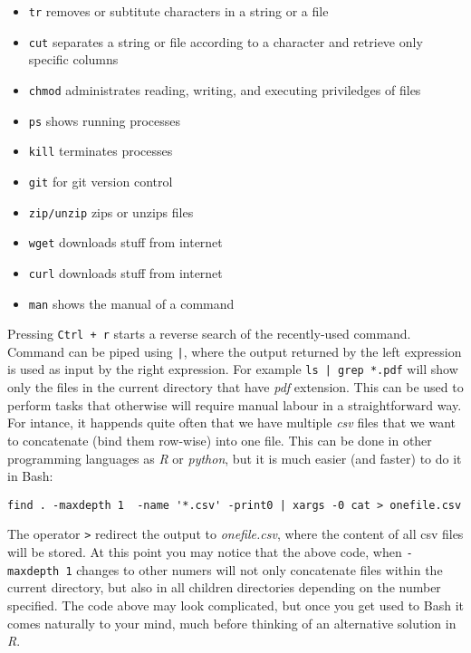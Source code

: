 \documentclass{book}
\begin{document}
\begin{itemize}
   \item[] \texttt{tr} removes or subtitute characters in a string or a file
   \item[] \texttt{cut} separates a string or file according to a character and retrieve only specific columns
   \item[] \texttt{chmod} administrates reading, writing, and executing priviledges of files
   \item[] \texttt{ps} shows running processes
   \item[] \texttt{kill} terminates processes
   \item[] \texttt{git} for git version control
   \item[] \texttt{zip/unzip} zips or unzips files
   \item[] \texttt{wget} downloads stuff from internet
   \item[] \texttt{curl} downloads stuff from internet
   \item[] \texttt{man} shows the manual of a command
\end{itemize}

Pressing \texttt{Ctrl + r} starts a reverse search of the recently-used command.
Command can be piped using \texttt{|}, where the output returned by the left expression is used as input by the right expression. For example \lstinline[columns=fixed]{ls | grep *.pdf} will show only the files in the current directory that have \textit{pdf} extension. This can be used to perform tasks that otherwise will require manual labour in a straightforward way. For intance, it happends quite often that we have multiple \textit{csv} files that we want to concatenate (bind them row-wise) into one file. This can be done in other programming languages as \textit{R} or \textit{python}, but it is much easier (and faster) to do it in Bash:

\begin{lstlisting}
find . -maxdepth 1  -name '*.csv' -print0 | xargs -0 cat > onefile.csv
\end{lstlisting}

The operator \texttt{>} redirect the output to \textit{onefile.csv}, where the content of all csv files will be stored. At this point you may notice that the above code, when \texttt{-maxdepth 1} changes to other numers will not only concatenate files within the current directory, but also in all children directories depending on the number specified. The code above may look complicated, but once you get used to Bash it comes naturally to your mind, much before thinking of an alternative solution in \textit{R}.
\end{document}
